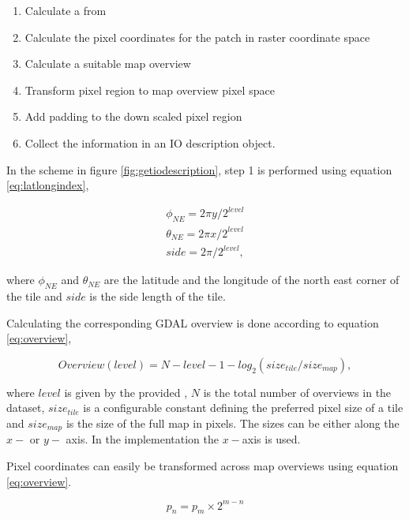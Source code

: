 \begin{enumerate}
\item Calculate a  from 
\item Calculate the pixel coordinates for the patch in raster coordinate space
\item Calculate a suitable map overview
\item Transform pixel region to map overview pixel space
\item Add padding to the down scaled pixel region
\item Collect the information in an IO description object.
\end{enumerate}

In the scheme in figure \ref{fig:getiodescription}, step 1 is performed using equation \ref{eq:latlongindex},

\begin{equation}
\label{eq:latlongindex}
\begin{split}
\phi_{NE} = 2\pi y / 2^{level} \\
\theta_{NE} = 2\pi x / 2^{level} \\
side = 2\pi / 2^{level},
\end{split} 
\end{equation}

where $\phi_{NE}$ and $\theta_{NE}$ are the latitude and the longitude of the north east corner of the tile and $side$ is the side length of the tile.

Calculating the corresponding GDAL overview is done according to equation \ref{eq:overview},

\begin{equation}
\label{eq:overview}
Overview(level) = N - level - 1 - log_2(size_{tile} / size_{map}),
\end{equation}

where $level$ is given by the provided , $N$ is the total number of overviews in the dataset, $size_{tile}$ is a configurable constant defining the preferred pixel size of a tile and $size_{map}$ is the size of the full map in pixels. The sizes can be either along the $x-$ or $y-$ axis. In the implementation the $x-$axis is used.

Pixel coordinates can easily be transformed across map overviews using equation \ref{eq:overview}.

\begin{equation}
\label{eq:overview}
p_{n} = p_{m} \times 2^{m-n}
\end{equation}

